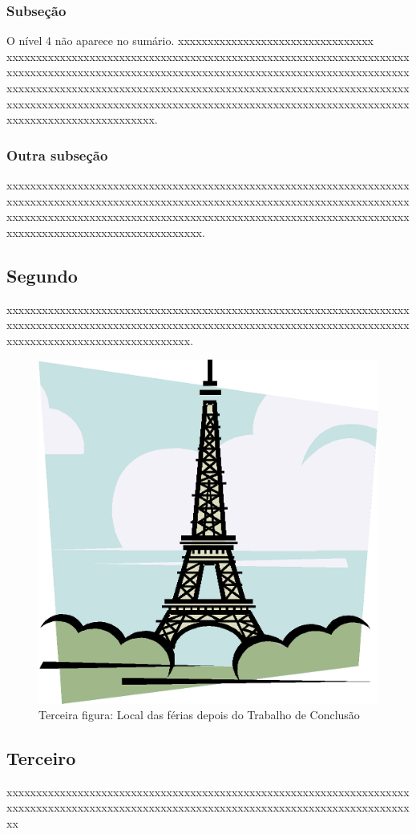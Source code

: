 \subsubsection{Subseção}

O nível 4 não aparece no sumário. xxxxxxxxxx\-xxxxxxxxxx\-xxxxxxxxxx\-xxx xxxxxxxxxx\-xxxxxxxxxx\-xxxxxxxxxx\-xxxxxxxxxx\-xxxxxxxxxx\-xxxxxxxxxx\-xxxxxxxxxx\-xxxxxxxxxx\-xxxxxxxxxx\-xxxxxxxxxx\-xxxxxxxxxx\-xxxxxxxxxx\-xxxxxxxxxx\-xxxxxxxxxx\-xxxxxxxxxx\-xxxxxxxxxx\-xxxxxxxxxx\-xxxxxxxxxx\-xxxxxxxxxx\-xxxxxxxxxx\-xxxxxxxxxx\-xxxxxxxxxx\-xxxxxxxxxx\-xxxxxxxxxx\-xxxxxxxxxx\-xxxxxxxxxx\-xxxxxxxxxx\-xxxxxxxxxx\-xxxxxxxxxx\-xxxxxxx.

\subsubsection{Outra subseção}

xxxxxxxxxx\-xxxxxxxxxx\-xxxxxxxxxx\-xxxxxxxxxx\-xxxxxxxxxx\-xxxxxxxxxx\-xxxxxxxxxx\-xxxxxxxxxx\-xxxxxxxxxx\-xxxxxxxxxx\-xxxxxxxxxx\-xxxxxxxxxx\-xxxxxxxxxx\-xxxxxxxxxx\-xxxxxxxxxx\-xxxxxxxxxx\-xxxxxxxxxx\-xxxxxxxxxx\-xxxxxxxxxx\-xxxxxxxxxx\-xxxxxxxxxx\-xxxxxxxxxx\-xxxxxxxxxx\-xxxxxxx.

\subsection{Segundo}

xxxxxxxxxx\-xxxxxxxxxx\-xxxxxxxxxx\-xxxxxxxxxx\-xxxxxxxxxx\-xxxxxxxxxx\-xxxxxxxxxx\-xxxxxxxxxx\-xxxxxxxxxx\-xxxxxxxxxx\-xxxxxxxxxx\-xxxxxxxxxx\-xxxxxxxxxx\-xxxxxxxxxx\-xxxxxxxxxx\-xxxxxxxxxx\-xxxxxxx.

\begin{figure}[h]
    \centerline{\includegraphics{imagens/img-paris.png}}
    \caption{Terceira figura: Local das férias depois do Trabalho de Conclusão}
    \label{fig:paris}
\end{figure}

\subsection{Terceiro}

xxxxxxxxxx\-xxxxxxxxxx\-xxxxxxxxxx\-xxxxxxxxxx\-xxxxxxxxxx\-xxxxxxxxxx\-xxxxxxxxxx\-xxxxxxxxxx\-xxxxxxxxxx\-xxxxxxxxxx\-xxxxxxxxxx\-xxxxxxxxxx\-xxxxxxxxxx\-xxxxxxxx

